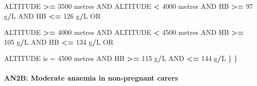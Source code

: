 \documentclass[12pt,a4paper]{article}
\newenvironment{Shaded}{\begin{snugshade}}{\end{snugshade}}
\newcommand{\DecValTok}[1]{\textcolor[rgb]{0.00,0.00,0.81}{#1}}
\newcommand{\NormalTok}[1]{#1}
\newcommand{\OperatorTok}[1]{\textcolor[rgb]{0.81,0.36,0.00}{\textbf{#1}}}
\newcommand{\StringTok}[1]{\textcolor[rgb]{0.31,0.60,0.02}{#1}}
\let\oldparagraph\paragraph
\renewcommand{\paragraph}[1]{\oldparagraph{#1}\mbox{}}
\begin{document}
\begin{Shaded}
\begin{Highlighting}[]
\NormalTok{        ALTITUDE }\OperatorTok{>=}\StringTok{ }\DecValTok{3500}\NormalTok{ metres AND ALTITUDE }\OperatorTok{<}\StringTok{ }\DecValTok{4000}\NormalTok{ metres AND }
\NormalTok{          HB }\OperatorTok{>=}\StringTok{ }\DecValTok{97}\NormalTok{ g}\OperatorTok{/}\NormalTok{L AND HB }\OperatorTok{<=}\StringTok{ }\DecValTok{126}\NormalTok{ g}\OperatorTok{/}\NormalTok{L OR}

\NormalTok{        ALTITUDE }\OperatorTok{>=}\StringTok{ }\DecValTok{4000}\NormalTok{ metres AND ALTITUDE }\OperatorTok{<}\StringTok{ }\DecValTok{4500}\NormalTok{ metres AND }
\NormalTok{          HB }\OperatorTok{>=}\StringTok{ }\DecValTok{105}\NormalTok{ g}\OperatorTok{/}\NormalTok{L AND HB }\OperatorTok{<=}\StringTok{ }\DecValTok{134}\NormalTok{ g}\OperatorTok{/}\NormalTok{L OR}

\NormalTok{        ALTITUDE is =}\StringTok{ }\DecValTok{4500}\NormalTok{ metres AND HB }\OperatorTok{>=}\StringTok{ }\DecValTok{115}\NormalTok{ g}\OperatorTok{/}\NormalTok{L AND }\OperatorTok{<=}\StringTok{ }\DecValTok{144}\NormalTok{ g}\OperatorTok{/}\NormalTok{L}
\NormalTok{      \}}
\NormalTok{  \}}
\end{Highlighting}
\end{Shaded}

\newpage

\hypertarget{an2b-moderate-anaemia-in-non-pregnant-carers}{%
\paragraph{AN2B: Moderate anaemia in non-pregnant carers}\label{an2b-moderate-anaemia-in-non-pregnant-carers}}
\end{document}
